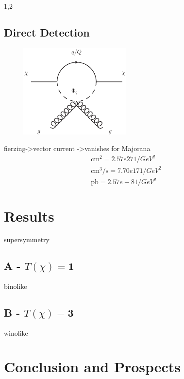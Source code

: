 \documentclass[11pt,a4paper,twoside]{article}
\numberwithin{equation}{section}
\begin{document}
\begin{spacing}{1,2}
\subsection{Direct Detection}
\begin{figure}[t]
 \includegraphics[width=0.5\textwidth]{../pics/phigluon.eps}
\end{figure}

fierzing->vector current ->vanishes for Majorana
\begin{align}
 \text{cm}^2 = 2.57e27 1/GeV^2\\
 \text{cm}^3/\text{s} = 7.70e17 1/GeV^2\\
 \text{pb} = 2.57e-8 1/GeV^2
\end{align}


\section{Results}
supersymmetry
\subsection{A - $T(\chi)=\boldsymbol{1}$}
binolike
\subsection{B - $T(\chi)=\boldsymbol{3}$}
winolike
\section{Conclusion and Prospects}



\end{spacing}
\end{document}

